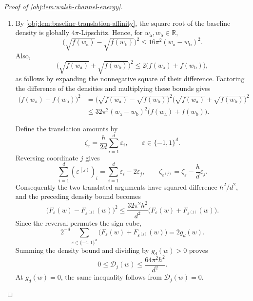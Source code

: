 \documentclass[11pt]{article}
\begin{document}
\begin{proof}[Proof of \cref{obj:lem:walsh-channel-energy}]
\begin{enumerate}
For \(g_d(w)>0\), apply this identity with
\[
v_{\mathrm{cube}}(\varepsilon)=\frac{F_\varepsilon(w)}{g_d(w)}.
\]
Its subset coefficients are \(a_{|E|}(w)\). Grouping subsets by cardinality and multiplying by \(g_d(w)\) gives
\[
\sum_{s=0}^d s\binom ds a_s(w)^2g_d(w)
=
\frac14\sum_{j=1}^d\mathcal D_j(w).
\]
At \(g_d(w)=0\), both sides vanish by their conventions, so this identity holds for every \(w\).

The coefficient densities are integrable: the triangle inequality gives, at positive \(g_d(w)\),
\[
|a_s(w)|
\le
2^{-d}\sum_{\varepsilon\in\{-1,1\}^d}
\frac{F_\varepsilon(w)}{g_d(w)}
=1,
\]
and the zero-density convention preserves this bound. Thus
\[
0\le a_s(w)^2g_d(w)\le g_d(w),
\qquad
\int_{\mathbb R}g_d(w)\,dw=1.
\]
The flip energies are integrable by the bounded compact-support envelope established in the next step. Integrating the pointwise identity and discarding its zero \(s=0\) term therefore gives
\[
\eta_1=\frac14\sum_{j=1}^d\int_{\mathbb R}\mathcal D_j(w)\,dw.
\]

\item By \cref{obj:lem:baseline-translation-affinity}, the square root of the baseline density is globally \(4\pi\)-Lipschitz. Hence, for \(w_{\mathrm a},w_{\mathrm b}\in\mathbb R\),
\[
\bigl(\sqrt{f(w_{\mathrm a})}-\sqrt{f(w_{\mathrm b})}\bigr)^2
\le16\pi^2(w_{\mathrm a}-w_{\mathrm b})^2.
\]
Also,
\[
\bigl(\sqrt{f(w_{\mathrm a})}+\sqrt{f(w_{\mathrm b})}\bigr)^2
\le2\bigl(f(w_{\mathrm a})+f(w_{\mathrm b})\bigr),
\]
as follows by expanding the nonnegative square of their difference. Factoring the difference of the densities and multiplying these bounds gives
\[
\begin{aligned}
\bigl(f(w_{\mathrm a})-f(w_{\mathrm b})\bigr)^2
&=
\bigl(\sqrt{f(w_{\mathrm a})}-\sqrt{f(w_{\mathrm b})}\bigr)^2
\bigl(\sqrt{f(w_{\mathrm a})}+\sqrt{f(w_{\mathrm b})}\bigr)^2\\
&\le
32\pi^2(w_{\mathrm a}-w_{\mathrm b})^2
\bigl(f(w_{\mathrm a})+f(w_{\mathrm b})\bigr).
\end{aligned}
\]

Define the translation amounts by
\[
\zeta_\varepsilon=\frac{h}{2d}\sum_{i=1}^d\varepsilon_i,
\qquad \varepsilon\in\{-1,1\}^d.
\]
Reversing coordinate \(j\) gives
\[
\sum_{i=1}^d(\varepsilon^{(j)})_i
=\sum_{i=1}^d\varepsilon_i-2\varepsilon_j,
\qquad
\zeta_{\varepsilon^{(j)}}=\zeta_\varepsilon-\frac hd\varepsilon_j.
\]
Consequently the two translated arguments have squared difference \(h^2/d^2\), and the preceding density bound becomes
\[
\bigl(F_\varepsilon(w)-F_{\varepsilon^{(j)}}(w)\bigr)^2
\le
\frac{32\pi^2h^2}{d^2}
\bigl(F_\varepsilon(w)+F_{\varepsilon^{(j)}}(w)\bigr).
\]
Since the reversal permutes the sign cube,
\[
2^{-d}\sum_{\varepsilon\in\{-1,1\}^d}
\bigl(F_\varepsilon(w)+F_{\varepsilon^{(j)}}(w)\bigr)
=2g_d(w).
\]
Summing the density bound and dividing by \(g_d(w)>0\) proves
\[
0\le\mathcal D_j(w)\le\frac{64\pi^2h^2}{d^2}.
\]
At \(g_d(w)=0\), the same inequality follows from \(\mathcal D_j(w)=0\).


\end{enumerate}
\end{proof}
\end{document}
